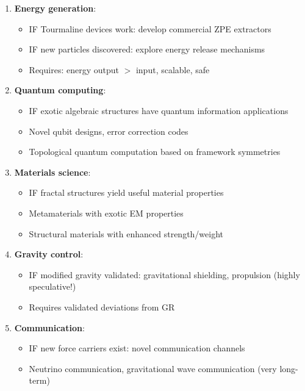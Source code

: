 \begin{enumerate}
    \item \textbf{Energy generation}:
    \begin{itemize}
        \item IF Tourmaline devices work: develop commercial ZPE extractors
        \item IF new particles discovered: explore energy release mechanisms
        \item Requires: energy output $>$ input, scalable, safe
    \end{itemize}

    \item \textbf{Quantum computing}:
    \begin{itemize}
        \item IF exotic algebraic structures have quantum information applications
        \item Novel qubit designs, error correction codes
        \item Topological quantum computation based on framework symmetries
    \end{itemize}

    \item \textbf{Materials science}:
    \begin{itemize}
        \item IF fractal structures yield useful material properties
        \item Metamaterials with exotic EM properties
        \item Structural materials with enhanced strength/weight
    \end{itemize}

    \item \textbf{Gravity control}:
    \begin{itemize}
        \item IF modified gravity validated: gravitational shielding, propulsion (highly speculative!)
        \item Requires validated deviations from GR
    \end{itemize}

    \item \textbf{Communication}:
    \begin{itemize}
        \item IF new force carriers exist: novel communication channels
        \item Neutrino communication, gravitational wave communication (very long-term)
    \end{itemize}
\end{enumerate}

